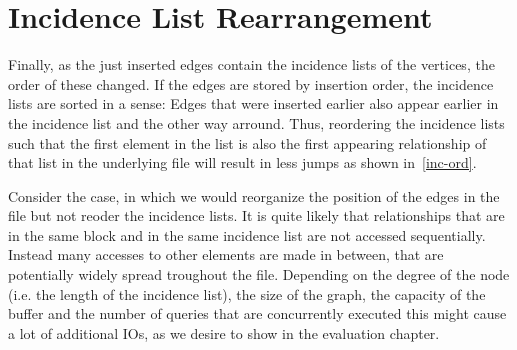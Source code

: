     \section{Incidence List Rearrangement}\label{\positionnumber}
        Finally, as the just inserted edges contain the incidence lists of the vertices, the order of these changed.
        If the edges are stored by insertion order, the incidence lists are sorted in a sense: 
        Edges that were inserted earlier also appear earlier in the incidence list and the other way arround.
        Thus, reordering the incidence lists such that the first element in the list is also the first appearing relationship of that list in the underlying file will result in less jumps as shown in~\ref{inc-ord}.
        
        Consider the case, in which we would reorganize the position of the edges in the file but not reoder the incidence lists. 
        It is quite likely that relationships that are in the same block and in the same incidence list are not accessed sequentially.
        Instead many accesses to other elements are made in between, that are potentially widely spread troughout the file.
        Depending on the degree of the node (i.e. the length of the incidence list), the size of the graph, the capacity of the buffer and the number of queries that are concurrently executed this might cause a lot of additional IOs, as we desire to show in the evaluation chapter.
